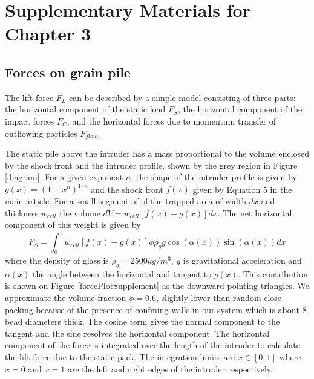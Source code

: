 \chapter{Supplementary Materials for Chapter 3}
\author{Mohammad Y Karim, Eric I. Corwin}


\section{Forces on grain pile}
The lift force $F_{L}$ can be described by a simple model consisting of three parts: the horizontal component of the static load $F_{S}$, the horizontal component of the impact forces $F_{C}$, and the horizontal forces due to momentum transfer of outflowing particles $F_{flow}$.  

The static pile above the intruder has a mass proportional to the volume enclosed by the shock front and the intruder profile, shown by the grey region in Figure \ref{diagram}. For a given exponent $n$, the shape of the intruder profile is given by $g(x)=(1-x^n)^{1/n}$ and the shock front $f(x)$ given by Equation 5 in the main article. For a small segment of of the trapped area of width $dx$ and thickness $w_{cell}$ the volume $dV=w_{cell}[f(x)-g(x)]dx$. The net horizontal component of this weight is given by
\begin{equation} 
F_{S} = \int_0^1  w_{cell}  [f(x)-g(x)] \phi\rho_{g}g\cos(\alpha(x)) \sin(\alpha(x))dx
\label{fstatic}
\end{equation}
where the density of glass is $\rho_{g}=2500kg/m^3$, $g$ is gravitational acceleration and $\alpha(x)$ the angle between the horizontal and tangent to $g(x)$. This contribution is shown on Figure \ref{forcePlotSupplement} as the downward pointing triangles. We approximate the volume fraction $\phi=0.6$, slightly lower than random close packing because of the presence of confining walls in our system which is about 8 bead diameters thick. The cosine term gives the normal component to the tangent and the sine resolves the horizontal component. The horizontal component of the force is integrated over the length of the intruder to calculate the lift force due to the static pack. The integration limits are $x\in[0,1]$ where $x=0$ and $x=1$ are the left and right edges of the intruder respectively. 

